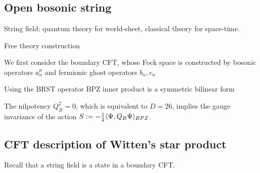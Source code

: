 \documentclass{../../large}
\begin{document}
\chapter{}



\section*{Open bosonic string}
String field: quantum theory for world-sheet, classical theory for space-time.

Free theory construction

We first consider the boundary CFT, whose Fock space is constructed by bosonic operators $a_n^\mu$ and fermionic ghost operators $b_n,c_n$

Using the BRST operator
BPZ inner product is a symmetric bilinear form

The nilpotency $Q_B^2=0$, which is equivalent to $D=26$, implies the gauge invariance of the action $S:=-\frac12\langle\Psi,Q_B\Psi\rangle_{BPZ}$.



\section*{CFT description of Witten's star product}

Recall that a string field is a state in a boundary CFT.
\end{document}
